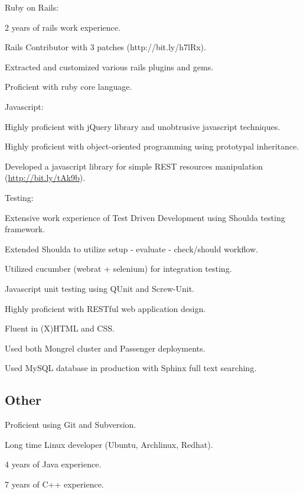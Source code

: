 \documentclass{resume}
\begin{document}
\begin{compactitem}
  \item Ruby on Rails:
    \begin{compactitem}
      \item 2 years of rails work experience.
      \item Rails Contributor with 3 patches \mbox{(http://bit.ly/h7lRx)}.
      \item Extracted and customized various rails plugins and gems.
      \item Proficient with ruby core language.
    \end{compactitem}

  \item Javascript:
    \begin{compactitem}
      \item Highly proficient with jQuery library and unobtrusive javascript techniques.
      \item Highly proficient with object-oriented programming using prototypal inheritance.
      \item Developed a javascript library for simple REST resources manipulation \mbox{(\url{http://bit.ly/tAk9b})}.
    \end{compactitem}

  \item Testing:
    \begin{compactitem}
      \item Extensive work experience of Test Driven Development using Shoulda testing framework.
      \item Extended Shoulda to utilize setup - evaluate - check/should workflow.
      \item Utilized cucumber (webrat + selenium) for integration testing.
      \item Javascript unit testing using QUnit and Screw-Unit.
    \end{compactitem}

  \item Highly proficient with RESTful web application design.
  \item Fluent in (X)HTML and CSS.
  \item Used both Mongrel cluster and Passenger deployments.
  \item Used MySQL database in production with Sphinx full text searching.
\end{compactitem}

\subsection{Other}
\begin{compactitem}
  \item Proficient using Git and Subversion.
  \item Long time Linux developer (Ubuntu, Archlinux, Redhat).
  \item 4 years of Java experience.
  \item 7 years of C++ experience.
\end{compactitem}
\end{document}
